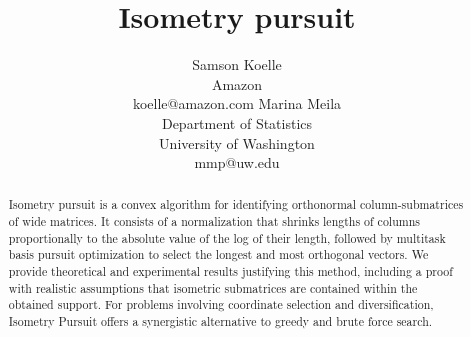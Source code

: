 \documentclass{article}
\title{Isometry pursuit}
\author{%
  Samson Koelle \\
  Amazon  \\
  koelle@amazon.com
  \And
  Marina Meila \\
  Department of Statistics\\
  University of Washington \\
  mmp@uw.edu
}
\begin{document}
\maketitle

\begin{abstract}
Isometry pursuit is a convex algorithm for identifying orthonormal column-submatrices of wide matrices.
It consists of a normalization that shrinks lengths of columns proportionally to the absolute value of the log of their length, followed by multitask basis pursuit optimization to select the longest and most orthogonal vectors.
We provide theoretical and experimental results justifying this method, including a proof with realistic assumptions that isometric submatrices are contained within the obtained support.
For problems involving coordinate selection and diversification, Isometry Pursuit offers a synergistic alternative to greedy and brute force search.
\end{abstract}








\newpage

%

\newpage


\end{document}
